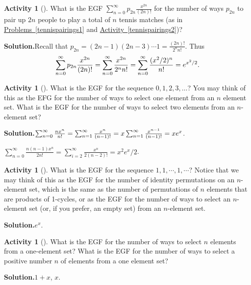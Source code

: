 \documentclass[10pt,]{book}
\theoremstyle{plain}
\theoremstyle{definition}
\newtheorem{activity}[project]{Activity}
\numberwithin{equation}{chapter}
\begin{document}
\begin{activity}[]\label{exponentialtennisparings}
What is the EGF \(\sum_{n=0}^\infty
p_{2n}\frac{x^{2n}}{(2n)!}\) for the number of ways \(p_{2n}\) to pair up \(2n\) people to play a total of \(n\) tennis matches (as in \hyperref[tennispairings1]{Problems~\ref{tennispairings1}} and \hyperref[tennispairings2]{Activity~\ref{tennispairings2}})?%
\par\medskip\noindent%
\textbf{Solution.}\quad Recall that \(p_{2n} = (2n-1)(2n-3)\cdots 1= \frac{(2n)!}{2^n
n!}\). Thus%
\begin{equation*}
\sum_{n=0}^\infty
p_{2n}\frac{x^{2n}}{(2n)!}= \sum_{n=0}^\infty \frac{x^{2n}}{2^n n!} =
\sum_{n=0 }^\infty {({x^2/2})^n\over n!} = e^{x^2/2} .
\end{equation*}
%
\end{activity}
\begin{activity}[]\label{activity-343}
What is the EGF for the sequence \(0,1,2,3,\ldots\)? You may think of this as the EFG for the number of ways to select one element from an \(n\) element set. What is the EGF for the number of ways to select two elements from an \(n\)-element set?%
\par\medskip\noindent%
\textbf{Solution.}\quad \(\sum_{n=0}^\infty\frac{ nx^n}{n!}=\sum_{n=1}^\infty\frac{
x^n}{(n-1)!}=x\sum_{n=1}^\infty{ x^{n-1}\over(n-1)!}=xe^x\).%
\par
\(\sum_{n=0}^\infty\frac{ n(n-1)x^n}{2 n!}=\sum_{i=2}^\infty \frac{x^n}{2(n-2)!}=x^2e^x/2\).%
\end{activity}
\begin{activity}[]\label{allonessequence}
What is the EGF for the sequence \(1,1,\cdots,1,\cdots\)? Notice that we may think of this as the EGF for the number of identity permutations on an \(n\)-element set, which is the same as the number of permutations of \(n\) elements that are products of 1-cycles, or as the EGF for the number of ways to select an \(n\)-element set (or, if you prefer, an empty set) from an \(n\)-element set.%
\par\medskip\noindent%
\textbf{Solution.}\quad \(e^x\).%
\end{activity}
\begin{activity}[]\label{activity-345}
What is the EGF for the number of ways to select \(n\) elements from a one-element set? What is the EGF for the number of ways to select a positive number \(n\) of elements from a one element set?%
\par\medskip\noindent%
\textbf{Solution.}\quad \(1+x\), \(x\).%
\end{activity}
\end{document}

